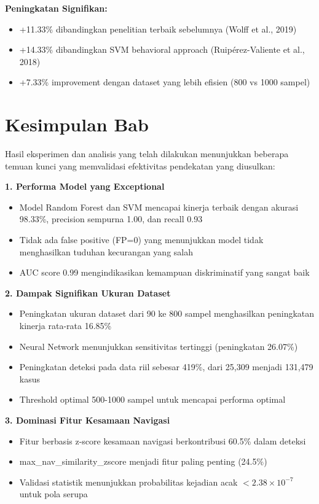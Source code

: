 \textbf{Peningkatan Signifikan:}
\begin{itemize}
    \item +11.33\% dibandingkan penelitian terbaik sebelumnya (Wolff et al., 2019)
    \item +14.33\% dibandingkan SVM behavioral approach (Ruip\'{e}rez-Valiente et al., 2018)
    \item +7.33\% improvement dengan dataset yang lebih efisien (800 vs 1000 sampel)
\end{itemize}

\section{Kesimpulan Bab}
\label{sec:kesimpulanBab4}

Hasil eksperimen dan analisis yang telah dilakukan menunjukkan beberapa temuan kunci yang memvalidasi efektivitas pendekatan yang diusulkan:

\textbf{1. Performa Model yang Exceptional}
\begin{itemize}
    \item Model Random Forest dan SVM mencapai kinerja terbaik dengan akurasi 98.33\%, precision sempurna 1.00, dan recall 0.93
    \item Tidak ada false positive (FP=0) yang menunjukkan model tidak menghasilkan tuduhan kecurangan yang salah
    \item AUC score 0.99 mengindikasikan kemampuan diskriminatif yang sangat baik
\end{itemize}

\textbf{2. Dampak Signifikan Ukuran Dataset}
\begin{itemize}
    \item Peningkatan ukuran dataset dari 90 ke 800 sampel menghasilkan peningkatan kinerja rata-rata 16.85\%
    \item Neural Network menunjukkan sensitivitas tertinggi (peningkatan 26.07\%)
    \item Peningkatan deteksi pada data riil sebesar 419\%, dari 25,309 menjadi 131,479 kasus
    \item Threshold optimal 500-1000 sampel untuk mencapai performa optimal
\end{itemize}

\textbf{3. Dominasi Fitur Kesamaan Navigasi}
\begin{itemize}
    \item Fitur berbasis z-score kesamaan navigasi berkontribusi 60.5\% dalam deteksi
    \item max\_nav\_similarity\_zscore menjadi fitur paling penting (24.5\%)
    \item Validasi statistik menunjukkan probabilitas kejadian acak $< 2.38 \times 10^{-7}$ untuk pola serupa
\end{itemize}

